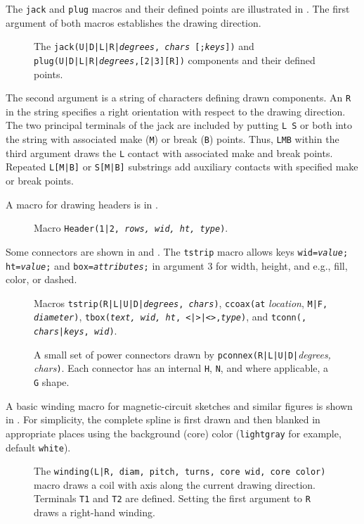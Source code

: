 The {\tt jack} and {\tt plug} macros and their defined points are
illustrated in .
The first argument of both macros establishes the drawing direction.
\begin{figure}[H]
   
   \vspace{-1ex}
   \caption{The {\tt jack(U|D|L|R|{\sl degrees}, {\sl chars} [;{\sl keys}])}
    and {\tt plug(U|D|L|R|{\sl degrees},[2|3][R])} components
    and their defined points.}
   \label{Jack}
   \end{figure}
\noindent%
\enlargethispage{\baselineskip}
 The second argument is a string of characters defining drawn components.
 An {\tt R} in the string specifies a
 right orientation with respect to the drawing direction.
 The two principal terminals of
 the jack are included by putting \hbox{{\tt L} {\tt S}}
 or both into the string with associated make ({\tt M})
 or break ({\tt B}) points.  Thus, {\tt LMB} within the third
 argument draws the {\tt L} contact with
 associated make and break points. Repeated {\tt L[M|B]}
 or {\tt S[M|B]} substrings add auxiliary contacts with 
 specified make or break points.


A macro for drawing headers is in .
\begin{figure}[H]
   
   \caption{Macro {\tt Header(1|2, {\sl rows, wid, ht, type})}.}
   \label{Headers}
   \end{figure}

Some connectors are shown in  and .
The {\tt tstrip} macro allows keys
 {\tt wid={\sl{}value};}
 {\tt ht={\sl{}value};} and
 {\tt box={\sl{}attributes};}
 in argument 3 for width, height, and e.g., fill, color, or dashed.
\begin{figure}[H]
   
   \caption{Macros {\tt tstrip(R|L|U|D|{\sl degrees}, {\sl chars})},
     {\tt ccoax(at} {\sl location}, {\tt M|F, {\sl diameter})},
     {\tt tbox({\sl text, wid, ht}, <|>|<>,{\sl type})}, and
     {\tt tconn(\linespec, {\sl chars}|{\sl keys}, {\sl wid})}. }
   \label{Conn}
   \end{figure}
\begin{figure}[H]
   
   \caption{A small set of power connectors drawn by
    {\tt pconnex(R|L|U|D|}{\sl degrees, chars}{\tt)}. Each connector has
    an internal {\tt H}, {\tt N}, and where applicable, a {\tt G} shape.}
   \label{Pconn}
   \end{figure}

A basic winding macro for magnetic-circuit sketches and similar figures
is shown in .
For simplicity, the complete spline
is first drawn and then blanked in appropriate places using the background
(core) color (\verb!lightgray! for example, default \verb!white!).
\begin{figure}[H]
   
   \caption{The {\tt winding(L|R, diam, pitch, turns, core wid, core color)}
     macro draws a coil with axis along the current drawing direction.
     Terminals {\tt T1} and {\tt T2} are defined.
     Setting the first argument to {\tt R} draws a right-hand winding.}
   \label{Windings}
   \end{figure}

